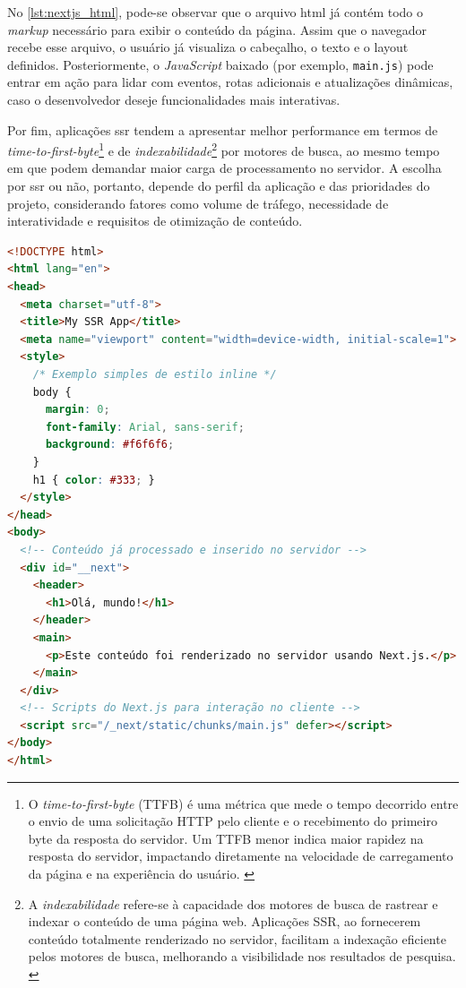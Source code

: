 No \autoref{lst:nextjs_html}, pode-se observar que o arquivo \acrshort{html} já contém todo o \emph{markup} necessário para exibir o conteúdo da página. Assim que o navegador recebe esse arquivo, o usuário já visualiza o cabeçalho, o texto e o layout definidos. Posteriormente, o \emph{JavaScript} baixado (por exemplo, \texttt{main.js}) pode entrar em ação para lidar com eventos, rotas adicionais e atualizações dinâmicas, caso o desenvolvedor deseje funcionalidades mais interativas.

Por fim, aplicações \acrshort{ssr} tendem a apresentar melhor performance em termos de \emph{time-to-first-byte}\footnote{O \emph{time-to-first-byte} (TTFB) é uma métrica que mede o tempo decorrido entre o envio de uma solicitação HTTP pelo cliente e o recebimento do primeiro byte da resposta do servidor. Um TTFB menor indica maior rapidez na resposta do servidor, impactando diretamente na velocidade de carregamento da página e na experiência do usuário. \cite{ttfb-craig}} e de \emph{indexabilidade}\footnote{A \emph{indexabilidade} refere-se à capacidade dos motores de busca de rastrear e indexar o conteúdo de uma página web. Aplicações SSR, ao fornecerem conteúdo totalmente renderizado no servidor, facilitam a indexação eficiente pelos motores de busca, melhorando a visibilidade nos resultados de pesquisa. \cite{ttfb-oskay}} por motores de busca, ao mesmo tempo em que podem demandar maior carga de processamento no servidor. A escolha por \acrshort{ssr} ou não, portanto, depende do perfil da aplicação e das prioridades do projeto, considerando fatores como volume de tráfego, necessidade de interatividade e requisitos de otimização de conteúdo.

\begin{lstlisting}[language=html, caption={Exemplo de HTML mínimo em aplicação Next.js com SSR}, label={lst:nextjs_html}]
<!DOCTYPE html>
<html lang="en">
<head>
  <meta charset="utf-8">
  <title>My SSR App</title>
  <meta name="viewport" content="width=device-width, initial-scale=1">
  <style>
    /* Exemplo simples de estilo inline */
    body {
      margin: 0;
      font-family: Arial, sans-serif;
      background: #f6f6f6;
    }
    h1 { color: #333; }
  </style>
</head>
<body>
  <!-- Conteúdo já processado e inserido no servidor -->
  <div id="__next">
    <header>
      <h1>Olá, mundo!</h1>
    </header>
    <main>
      <p>Este conteúdo foi renderizado no servidor usando Next.js.</p>
    </main>
  </div>
  <!-- Scripts do Next.js para interação no cliente -->
  <script src="/_next/static/chunks/main.js" defer></script>
</body>
</html>
\end{lstlisting}



